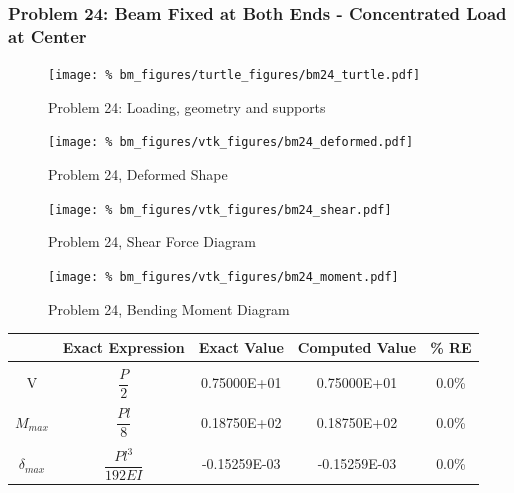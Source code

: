 %
%

\clearpage
\subsubsection{Problem 24: Beam Fixed at Both Ends - Concentrated Load at Center}
\begin{figure}[h]
    \texttt{[image: \%
                            bm\_figures/turtle\_figures/bm24\_turtle.pdf]}
    \centering
    \caption{Problem 24: Loading, geometry and supports}
    \label{fig:bm24_turtle}
\end{figure}


\begin{figure}[!htb]
    \texttt{[image: \%
                     bm\_figures/vtk\_figures/bm24\_deformed.pdf]}
    \centering
    \caption{Problem 24, Deformed Shape}
    \label{fig:bm24_deformed}
\end{figure}
\begin{figure}[!htb]
    \texttt{[image: \%
                     bm\_figures/vtk\_figures/bm24\_shear.pdf]}
    \centering
    \caption{Problem 24, Shear Force Diagram}
    \label{fig:bm24_shear}
\end{figure}
\begin{figure}[!htb]
    \texttt{[image: \%
                     bm\_figures/vtk\_figures/bm24\_moment.pdf]}
    \centering
    \caption{Problem 24, Bending Moment Diagram}
    \label{fig:bm24_moment}
\end{figure}
\begin{table}[h!]
\centering
\begin{tabular}{ c| c c c c }
    & Exact Expression & Exact Value & Computed Value & \% RE \\ \hline \\
    V  & $\dfrac{P}{2}$ & 0.75000E+01 & 0.75000E+01 & 0.0\% \\ \\
    $M_{max}$ & $\dfrac{Pl}{8}$ & 0.18750E+02 & 0.18750E+02 & 0.0\% \\ \\
    $\delta_{max}$ & $\dfrac{Pl^3}{192EI}$ & -0.15259E-03 & -0.15259E-03 & 0.0\% \\
\end{tabular}
\end{table}

%
%

\clearpage
